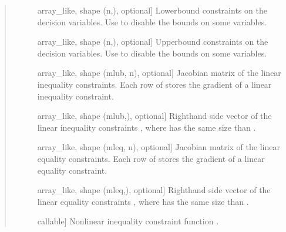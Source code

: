 \documentclass[letterpaper,10pt,english]{sphinxmanual}
\begin{document}
\begin{fulllineitems}
\begin{quote}
\begin{description}
\begin{description}
\item[{}] \leavevmode{[}array\_like, shape (n,), optional{]}
\sphinxAtStartPar
Lower\sphinxhyphen{}bound constraints on the decision variables. Use  to
disable the bounds on some variables.

\item[{}] \leavevmode{[}array\_like, shape (n,), optional{]}
\sphinxAtStartPar
Upper\sphinxhyphen{}bound constraints on the decision variables. Use  to
disable the bounds on some variables.

\item[{}] \leavevmode{[}array\_like, shape (mlub, n), optional{]}
\sphinxAtStartPar
Jacobian matrix of the linear inequality constraints. Each row of 
stores the gradient of a linear inequality constraint.

\item[{}] \leavevmode{[}array\_like, shape (mlub,), optional{]}
\sphinxAtStartPar
Right\sphinxhyphen{}hand side vector of the linear inequality constraints
, where  has the same size than .

\item[{}] \leavevmode{[}array\_like, shape (mleq, n), optional{]}
\sphinxAtStartPar
Jacobian matrix of the linear equality constraints. Each row of 
stores the gradient of a linear equality constraint.

\item[{}] \leavevmode{[}array\_like, shape (mleq,), optional{]}
\sphinxAtStartPar
Right\sphinxhyphen{}hand side vector of the linear equality constraints
, where  has the same size than .

\item[{}] \leavevmode{[}callable{]}
\sphinxAtStartPar
Nonlinear inequality constraint function .
\begin{quote}

\sphinxAtStartPar
{}
\end{quote}


\end{description}
\end{description}
\end{quote}
\end{fulllineitems}
\end{document}
